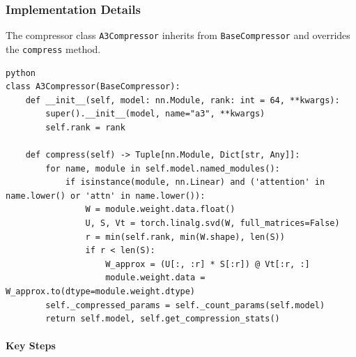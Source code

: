 \subsubsection*{Implementation Details}

The compressor class \texttt{A3Compressor} inherits from \texttt{BaseCompressor} and overrides the \texttt{compress} method.

\vspace{0.5em}
\begin{mdframed}[backgroundcolor=codebg, linecolor=codeframe, linewidth=1pt, roundcorner=4pt, innerleftmargin=2pt, innerrightmargin=5pt, innertopmargin=5pt, innerbottommargin=5pt]
\begin{lstlisting}
python
class A3Compressor(BaseCompressor):
    def __init__(self, model: nn.Module, rank: int = 64, **kwargs):
        super().__init__(model, name="a3", **kwargs)
        self.rank = rank

    def compress(self) -> Tuple[nn.Module, Dict[str, Any]]:
        for name, module in self.model.named_modules():
            if isinstance(module, nn.Linear) and ('attention' in name.lower() or 'attn' in name.lower()):
                W = module.weight.data.float()
                U, S, Vt = torch.linalg.svd(W, full_matrices=False)
                r = min(self.rank, min(W.shape), len(S))
                if r < len(S):
                    W_approx = (U[:, :r] * S[:r]) @ Vt[:r, :]
                    module.weight.data = W_approx.to(dtype=module.weight.dtype)
        self._compressed_params = self._count_params(self.model)
        return self.model, self.get_compression_stats()
\end{lstlisting}
\end{mdframed}
\vspace{0.5em}

\paragraph{Key Steps}

